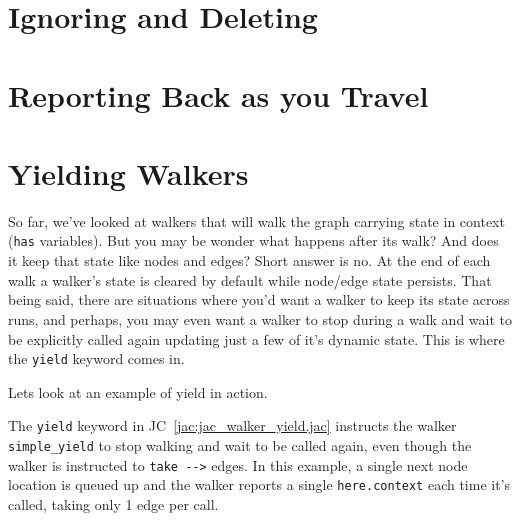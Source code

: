 \section{Ignoring and Deleting}

\par
{}

\par
{}

\section{Reporting Back as you Travel}

\par
{}


\section{Yielding Walkers}

So far, we've looked at walkers that will walk the graph carrying state in context (\lstinline{has} variables).
But you may be wonder what happens after its walk? And does it keep that state like nodes and edges? Short answer is no.
At the end of each walk a walker's state is cleared by default while node/edge state persists.
That being said, there are situations where you'd want a walker to keep its state across runs, and perhaps, you may even want a walker to stop during a walk and wait to be explicitly called again updating just a few of it's dynamic state.
This is where the \lstinline{yield} keyword comes in.
\par
Lets look at an example of yield in action.
\par
{}


\par
The \lstinline{yield} keyword in JC~\ref{jac:jac_walker_yield.jac} instructs the walker \lstinline{simple_yield} to stop walking and wait to be called again, even though the walker is instructed to \lstinline{take -->} edges. In this example, a single next node location is queued up and the walker reports a single \lstinline{here.context} each time it's called, taking only 1 edge per call.

